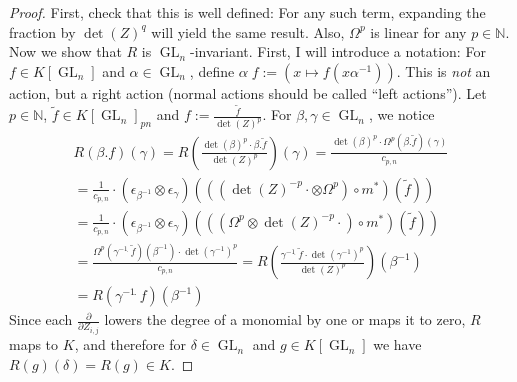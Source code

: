 \begin{proof}
  First, check that this is well defined:
  For any such term, expanding the fraction by $ \operatorname{det} (Z)^q $ will yield the same result.
  Also, $\Omega^p$ is linear for any $p \in \mathbb{N}$.
  Now we show that $R$ is $\operatorname{GL}_n$-invariant.
  First, I will introduce a notation:
  For $f \in K \left\lbrack \operatorname{GL}_n \right\rbrack $ and $\alpha \in \operatorname{GL}_n$, define $ \alpha \dot{\phantom{.}} f := \left( x \mapsto f \left( x \alpha^{-1} \right) \right) $.
  This is \textit{not} an action, but a right action (normal actions should be called ``left actions'').
  Let $p \in \mathbb{N}$, $ \tilde{f} \in K \left\lbrack \operatorname{GL}_n \right\rbrack_{pn} $ and $ f := \frac{\tilde{f}}{\operatorname{det}(Z)^p} $.
  For $ \beta , \gamma \in \operatorname{GL}_n $, we notice
  \begin{equation}
    \begin{aligned}
      R \left( \beta . f \right) (\gamma)
      = R \left( \frac{ \operatorname{det} (\beta)^p \cdot \beta . \tilde{f}}{\operatorname{det} (Z)^p} \right) (\gamma)
      = \frac{ \operatorname{det} (\beta)^p \cdot \Omega^p \left( \beta . \tilde{f} \right) (\gamma) }{ c_{p,n} } \\
      = \frac{1}{c_{p,n}} \cdot \left( \epsilon_{\beta^{-1}} \otimes \epsilon_\gamma \right) \left( \left( \left( \operatorname{det}(Z)^{-p} \cdot \otimes \Omega^p \right) \circ m^\ast \right) \left( \tilde{f} \right) \right) \\
      = \frac{1}{c_{p,n}} \cdot \left( \epsilon_{\beta^{-1}} \otimes \epsilon_\gamma \right) \left( \left( \left( \Omega^p \otimes \operatorname{det}(Z)^{-p} \cdot \right) \circ m^\ast \right) \left( \tilde{f} \right) \right) \\
      = \frac{ \Omega^p \left( \gamma^{-1} \dot{\phantom{.}} \tilde{f} \right) (\beta^{-1}) \cdot \operatorname{det} \left (\gamma^{-1} \right)^p }{ c_{p,n} }
      = R \left( \frac{ \gamma^{-1} \dot{\phantom{.}} \tilde{f} \cdot \operatorname{det} \left( \gamma^{-1} \right)^p }{\operatorname{det} (Z)^p} \right) \left( \beta^{-1} \right) \\
      = R \left( \gamma^{-1} \dot{\phantom{.}} f \right) \left( \beta^{-1} \right)
    \end{aligned}
  \end{equation}
  Since each $ \frac {\partial}{ \partial Z_{i,j} } $ lowers the degree of a monomial by one or maps it to zero, $R$ maps to $K$, and therefore for $ \delta \in \operatorname{GL}_n $ and $ g \in K \left\lbrack \operatorname{GL}_n \right\rbrack $ we have $ R(g)(\delta) = R(g) \in K $.

\end{proof}
